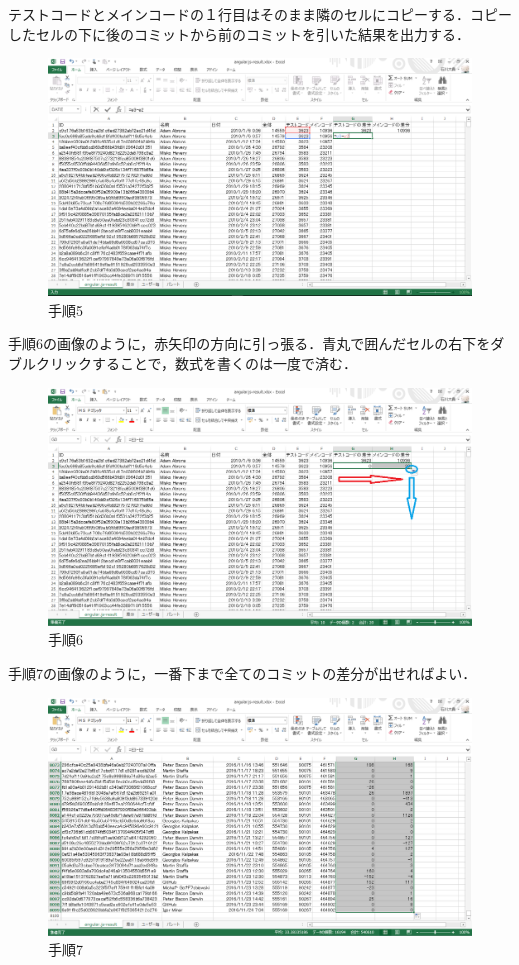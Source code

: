 \newpage

テストコードとメインコードの１行目はそのまま隣のセルにコピーする．コピーしたセルの下に後のコミットから前のコミットを引いた結果を出力する．

\begin{figure}[h]
\centering
\includegraphics[width=13cm]{process5.png}
\caption{手順5}
\end{figure}

\newpage

手順6の画像のように，赤矢印の方向に引っ張る．青丸で囲んだセルの右下をダブルクリックすることで，数式を書くのは一度で済む．

\begin{figure}[h]
\centering
\includegraphics[width=13cm]{process6.png}
\caption{手順6}
\end{figure}

手順7の画像のように，一番下まで全てのコミットの差分が出せればよい．

\begin{figure}[h]
\centering
\includegraphics[width=13cm]{process7.png}
\caption{手順7}
\end{figure}

